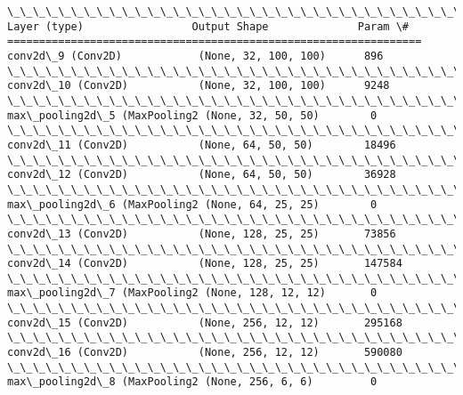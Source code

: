 \documentclass[11pt]{article}
\begin{document}
    \begin{Verbatim}[commandchars=\\\{\}]
\_\_\_\_\_\_\_\_\_\_\_\_\_\_\_\_\_\_\_\_\_\_\_\_\_\_\_\_\_\_\_\_\_\_\_\_\_\_\_\_\_\_\_\_\_\_\_\_\_\_\_\_\_\_\_\_\_\_\_\_\_\_\_\_\_
Layer (type)                 Output Shape              Param \#   
=================================================================
conv2d\_9 (Conv2D)            (None, 32, 100, 100)      896       
\_\_\_\_\_\_\_\_\_\_\_\_\_\_\_\_\_\_\_\_\_\_\_\_\_\_\_\_\_\_\_\_\_\_\_\_\_\_\_\_\_\_\_\_\_\_\_\_\_\_\_\_\_\_\_\_\_\_\_\_\_\_\_\_\_
conv2d\_10 (Conv2D)           (None, 32, 100, 100)      9248      
\_\_\_\_\_\_\_\_\_\_\_\_\_\_\_\_\_\_\_\_\_\_\_\_\_\_\_\_\_\_\_\_\_\_\_\_\_\_\_\_\_\_\_\_\_\_\_\_\_\_\_\_\_\_\_\_\_\_\_\_\_\_\_\_\_
max\_pooling2d\_5 (MaxPooling2 (None, 32, 50, 50)        0         
\_\_\_\_\_\_\_\_\_\_\_\_\_\_\_\_\_\_\_\_\_\_\_\_\_\_\_\_\_\_\_\_\_\_\_\_\_\_\_\_\_\_\_\_\_\_\_\_\_\_\_\_\_\_\_\_\_\_\_\_\_\_\_\_\_
conv2d\_11 (Conv2D)           (None, 64, 50, 50)        18496     
\_\_\_\_\_\_\_\_\_\_\_\_\_\_\_\_\_\_\_\_\_\_\_\_\_\_\_\_\_\_\_\_\_\_\_\_\_\_\_\_\_\_\_\_\_\_\_\_\_\_\_\_\_\_\_\_\_\_\_\_\_\_\_\_\_
conv2d\_12 (Conv2D)           (None, 64, 50, 50)        36928     
\_\_\_\_\_\_\_\_\_\_\_\_\_\_\_\_\_\_\_\_\_\_\_\_\_\_\_\_\_\_\_\_\_\_\_\_\_\_\_\_\_\_\_\_\_\_\_\_\_\_\_\_\_\_\_\_\_\_\_\_\_\_\_\_\_
max\_pooling2d\_6 (MaxPooling2 (None, 64, 25, 25)        0         
\_\_\_\_\_\_\_\_\_\_\_\_\_\_\_\_\_\_\_\_\_\_\_\_\_\_\_\_\_\_\_\_\_\_\_\_\_\_\_\_\_\_\_\_\_\_\_\_\_\_\_\_\_\_\_\_\_\_\_\_\_\_\_\_\_
conv2d\_13 (Conv2D)           (None, 128, 25, 25)       73856     
\_\_\_\_\_\_\_\_\_\_\_\_\_\_\_\_\_\_\_\_\_\_\_\_\_\_\_\_\_\_\_\_\_\_\_\_\_\_\_\_\_\_\_\_\_\_\_\_\_\_\_\_\_\_\_\_\_\_\_\_\_\_\_\_\_
conv2d\_14 (Conv2D)           (None, 128, 25, 25)       147584    
\_\_\_\_\_\_\_\_\_\_\_\_\_\_\_\_\_\_\_\_\_\_\_\_\_\_\_\_\_\_\_\_\_\_\_\_\_\_\_\_\_\_\_\_\_\_\_\_\_\_\_\_\_\_\_\_\_\_\_\_\_\_\_\_\_
max\_pooling2d\_7 (MaxPooling2 (None, 128, 12, 12)       0         
\_\_\_\_\_\_\_\_\_\_\_\_\_\_\_\_\_\_\_\_\_\_\_\_\_\_\_\_\_\_\_\_\_\_\_\_\_\_\_\_\_\_\_\_\_\_\_\_\_\_\_\_\_\_\_\_\_\_\_\_\_\_\_\_\_
conv2d\_15 (Conv2D)           (None, 256, 12, 12)       295168    
\_\_\_\_\_\_\_\_\_\_\_\_\_\_\_\_\_\_\_\_\_\_\_\_\_\_\_\_\_\_\_\_\_\_\_\_\_\_\_\_\_\_\_\_\_\_\_\_\_\_\_\_\_\_\_\_\_\_\_\_\_\_\_\_\_
conv2d\_16 (Conv2D)           (None, 256, 12, 12)       590080    
\_\_\_\_\_\_\_\_\_\_\_\_\_\_\_\_\_\_\_\_\_\_\_\_\_\_\_\_\_\_\_\_\_\_\_\_\_\_\_\_\_\_\_\_\_\_\_\_\_\_\_\_\_\_\_\_\_\_\_\_\_\_\_\_\_
max\_pooling2d\_8 (MaxPooling2 (None, 256, 6, 6)         0         

\end{Verbatim}
\end{document}
